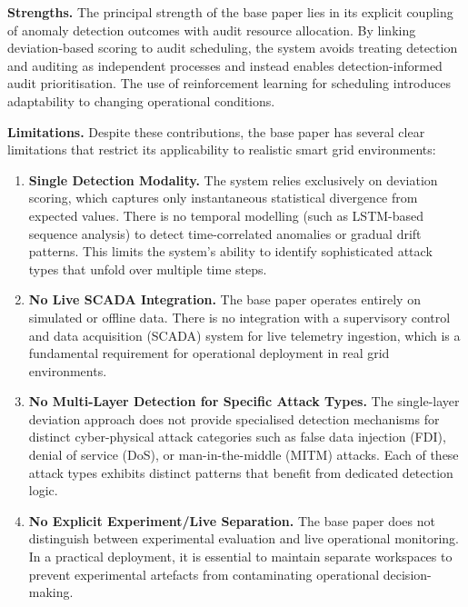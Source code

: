 \noindent
\textbf{Strengths.}
The principal strength of the base paper lies in its explicit coupling of anomaly detection outcomes with audit resource allocation. By linking deviation-based scoring to audit scheduling, the system avoids treating detection and auditing as independent processes and instead enables detection-informed audit prioritisation. The use of reinforcement learning for scheduling introduces adaptability to changing operational conditions.

\par \vspace{0.35cm}

\noindent
\textbf{Limitations.}
Despite these contributions, the base paper has several clear limitations that restrict its applicability to realistic smart grid environments:

\begin{enumerate}
    \item \textbf{Single Detection Modality.} The system relies exclusively on deviation scoring, which captures only instantaneous statistical divergence from expected values. There is no temporal modelling (such as LSTM-based sequence analysis) to detect time-correlated anomalies or gradual drift patterns. This limits the system's ability to identify sophisticated attack types that unfold over multiple time steps.

    \item \textbf{No Live SCADA Integration.} The base paper operates entirely on simulated or offline data. There is no integration with a supervisory control and data acquisition (SCADA) system for live telemetry ingestion, which is a fundamental requirement for operational deployment in real grid environments.

    \item \textbf{No Multi-Layer Detection for Specific Attack Types.} The single-layer deviation approach does not provide specialised detection mechanisms for distinct cyber-physical attack categories such as false data injection (FDI), denial of service (DoS), or man-in-the-middle (MITM) attacks. Each of these attack types exhibits distinct patterns that benefit from dedicated detection logic.

    \item \textbf{No Explicit Experiment/Live Separation.} The base paper does not distinguish between experimental evaluation and live operational monitoring. In a practical deployment, it is essential to maintain separate workspaces to prevent experimental artefacts from contaminating operational decision-making.


\end{enumerate}
